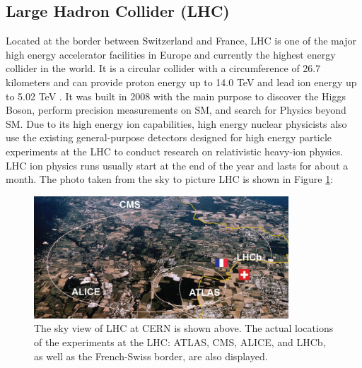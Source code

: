 
\subsection{Large Hadron Collider (LHC)} 

Located at the border between Switzerland and France, LHC is one of the major high energy accelerator facilities in Europe and currently the highest energy collider in the world. It is a circular collider with a circumference of 26.7 kilometers and can provide proton energy up to 14.0 TeV and lead ion energy up to 5.02 TeV \cite{LHCReport}. It was built in 2008 with the main purpose to discover the Higgs Boson, perform precision measurements on SM, and search for Physics beyond SM. Due to its high energy ion capabilities, high energy nuclear physicists also use the existing general-purpose detectors designed for high energy particle experiments at the LHC to conduct research on relativistic heavy-ion physics. LHC ion physics runs usually start at the end of the year and lasts for about a month. The photo taken from the sky to picture LHC is shown in Figure \ref{LHC}:

\begin{figure}[hbtp]
\begin{center}
\includegraphics[width=0.85\textwidth]{Figures/Chapter1/LHC.png}
\caption{The sky view of LHC at CERN is shown above. The actual locations of the experiments at the LHC: ATLAS, CMS, ALICE, and LHCb, as well as the French-Swiss border, are also displayed.}
\label{LHC}
\end{center}
\end{figure} 

